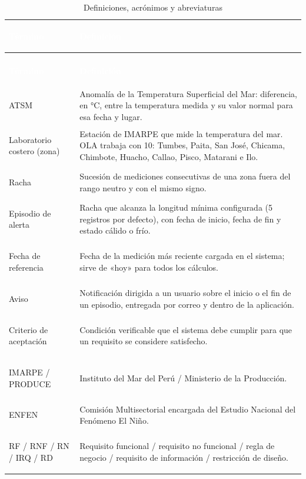 \documentclass[11pt,a4paper,oneside]{article}
\begin{document}
{\small
\begin{xltabular}{\textwidth}{@{}>{\sffamily\bfseries\raggedright\arraybackslash}p{4.2cm}Y@{}}
\caption{Definiciones, acrónimos y abreviaturas}\label{tab:defs}\\
\textcolor{white}{\sffamily\bfseries\footnotesize Término} & \textcolor{white}{\sffamily\bfseries\footnotesize Definición}\\
\endfirsthead
{}\\
\textcolor{white}{\sffamily\bfseries\footnotesize Término} & \textcolor{white}{\sffamily\bfseries\footnotesize Definición}\\
\endhead
ATSM & Anomalía de la Temperatura Superficial del Mar: diferencia, en °C, entre la temperatura medida y su valor normal para esa fecha y lugar.\\ \hline
{}Laboratorio costero (zona) & Estación de IMARPE que mide la temperatura del mar. OLA trabaja con 10: Tumbes, Paita, San José, Chicama, Chimbote, Huacho, Callao, Pisco, Matarani e Ilo.\\ \hline
Racha & Sucesión de mediciones consecutivas de una zona fuera del rango neutro y con el mismo signo.\\ \hline
{}Episodio de alerta & Racha que alcanza la longitud mínima configurada (5 registros por defecto), con fecha de inicio, fecha de fin y estado cálido o frío.\\ \hline
Fecha de referencia & Fecha de la medición más reciente cargada en el sistema; sirve de «hoy» para todos los cálculos.\\ \hline
{}Aviso & Notificación dirigida a un usuario sobre el inicio o el fin de un episodio, entregada por correo y dentro de la aplicación.\\ \hline
Criterio de aceptación & Condición verificable que el sistema debe cumplir para que un requisito se considere satisfecho.\\ \hline
{}IMARPE / PRODUCE & Instituto del Mar del Perú / Ministerio de la Producción.\\ \hline
ENFEN & Comisión Multisectorial encargada del Estudio Nacional del Fenómeno El Niño.\\ \hline
{}RF / RNF / RN / IRQ / RD & Requisito funcional / requisito no funcional / regla de negocio / requisito de información / restricción de diseño.\\ \hline

\end{xltabular}}
\end{document}
